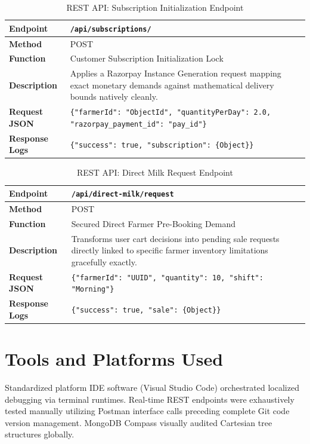 \documentclass[12pt,a4paper]{report}
\begin{document}
\vspace{0.4cm}
\begin{table}[htbp]
\centering
\begin{tabular}{|p{3cm}|p{11cm}|}
\hline
\textbf{Endpoint} & \texttt{/api/subscriptions/} \\ \hline
\textbf{Method} & POST \\ \hline
\textbf{Function} & Customer Subscription Initialization Lock \\ \hline
\textbf{Description} & Applies a Razorpay Instance Generation request mapping exact monetary demands against mathematical delivery bounds natively cleanly. \\ \hline
\textbf{Request JSON} & \texttt{\{"farmerId": "ObjectId", "quantityPerDay": 2.0, "razorpay\_payment\_id": "pay\_id"\}} \\ \hline
\textbf{Response Logs} & \texttt{\{"success": true, "subscription": \{Object\}\}} \\ \hline
\end{tabular}
\caption{REST API: Subscription Initialization Endpoint}
\end{table}
\vspace{0.4cm}

\vspace{0.4cm}
\begin{table}[htbp]
\centering
\begin{tabular}{|p{3cm}|p{11cm}|}
\hline
\textbf{Endpoint} & \texttt{/api/direct-milk/request} \\ \hline
\textbf{Method} & POST \\ \hline
\textbf{Function} & Secured Direct Farmer Pre-Booking Demand \\ \hline
\textbf{Description} & Transforms user cart decisions into pending sale requests directly linked to specific farmer inventory limitations gracefully exactly. \\ \hline
\textbf{Request JSON} & \texttt{\{"farmerId": "UUID", "quantity": 10, "shift": "Morning"\}} \\ \hline
\textbf{Response Logs} & \texttt{\{"success": true, "sale": \{Object\}\}} \\ \hline
\end{tabular}
\caption{REST API: Direct Milk Request Endpoint}
\end{table}
\vspace{0.4cm}


\section{Tools and Platforms Used}
Standardized platform IDE software (Visual Studio Code) orchestrated localized debugging via terminal runtimes. Real-time REST endpoints were exhaustively tested manually utilizing Postman interface calls preceding complete Git code version management. MongoDB Compass visually audited Cartesian tree structures globally.
\end{document}
